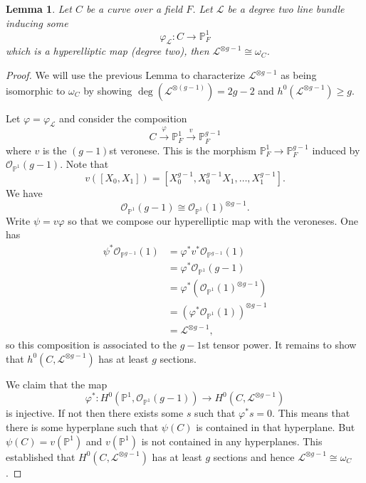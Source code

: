 \documentclass[12pt]{article}
\numberwithin{equation}{section}
\newtheorem{lemma}[theorem]{Lemma}
\theoremstyle{definition}
\theoremstyle{remark}
\newcommand{\Ocal}{\mathcal{O}}
\newcommand{\PP}{\mathbb{P}}
\newcommand{\Lcal}{\mathcal{L}}
\begin{document}
\begin{lemma}
	Let $C$ be a curve over a field $F$. 
	Let $\Lcal$ be a degree two line bundle inducing some 
	$$\varphi_{\Lcal}: C\to \PP^1_F$$ 
	which is a hyperelliptic map (degree two), then $\Lcal^{\otimes g-1} \cong \omega_C$.
\end{lemma}
\begin{proof}
	We will use the previous Lemma to characterize $\Lcal^{\otimes g-1}$ as being isomorphic to $\omega_C$ by showing $\deg(\Lcal^{\otimes(g-1)})=2g-2$ and $h^0(\Lcal^{\otimes g-1})\geq g$. 
	
	Let $\varphi = \varphi_{\Lcal}$ and consider the composition
	$$ C \xrightarrow{\varphi} \PP^1_F \xrightarrow{v} \PP^{g-1}_F $$
	where $v$ is the $(g-1)$st veronese. 
	This is the morphism $\PP^1_F\to \PP^{g-1}_F$ induced by $\Ocal_{\PP^1}(g-1)$. 
	Note that 
	$$ v([X_0,X_1]) = [X_0^{g-1}, X_0^{g-1}X_1, \ldots, X_1^{g-1}].$$
	We have 
	$$ \Ocal_{\PP^1}(g-1) \cong \Ocal_{\PP^1}(1)^{\otimes g-1}.$$
	Write $\psi = v\varphi$ so that we compose our hyperelliptic map with the veroneses. 
	One has 
	\begin{align*}
	\psi^* \Ocal_{\PP^{g-1}}(1) &= \varphi^*v^*\Ocal_{\PP^{g-1}}(1) \\
	& = \varphi^* \Ocal_{\PP^1}(g-1) \\
	&= \varphi^*\left( \Ocal_{\PP^1}(1)^{\otimes g-1}\right) \\
	&= (\varphi^*\Ocal_{\PP^1}(1))^{\otimes g-1} \\
	&= \Lcal^{\otimes g-1},
	\end{align*}
	so this composition is associated to the $g-1$st tensor power. 
	It remains to show that $h^0(C,\Lcal^{\otimes g-1})$ has at least $g$ sections.
	
	We claim that the map 
	$$ \varphi^*: H^0(\PP^1,\Ocal_{\PP^1}(g-1)) \to H^0(C,\Lcal^{\otimes g-1}) $$
	is injective. 
	If not then there exists some $s$ such that $\varphi^*s=0$. 
	This means that there is some hyperplane such that $\psi(C)$ is contained in that hyperplane. 
	But $\psi(C)=v(\PP^1)$ and $v(\PP^1)$ is not contained in any hyperplanes.
	This established that $H^0(C,\Lcal^{\otimes g-1})$ has at least $g$ sections and hence $\Lcal^{\otimes g-1} \cong \omega_C$.
\end{proof}
\end{document}
